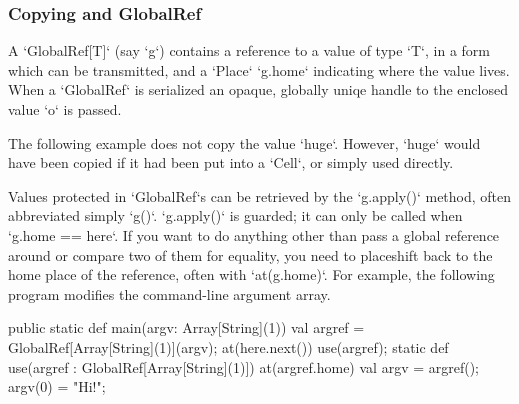 \subsubsection{Copying and GlobalRef}
\label{GlobalRef}

A \xcd`GlobalRef[T]` (say \xcd`g`) contains a reference to
a value of type \xcd`T`, in a form which can be transmitted, and a \xcd`Place`
\xcd`g.home` indicating where the value lives. When a 
\xcd`GlobalRef` is serialized an opaque, globally uniqe handle to
the enclosed value \xcd`o` is passed. 

The following example does not copy the value \xcd`huge`.  However, \xcd`huge`
would have been copied if it had been put into a \xcd`Cell`, or simply used
directly. 
\begin{xten}
val huge = "A potentially big thing";
val href = GlobalRef(huge);
at (here) {
   use(href);
  }
}
\end{xten}


Values protected in \xcd`GlobalRef`s can be retrieved by the \xcd`g.apply()`
method, often abbreviated simply \xcd`g()`.  \xcd`g.apply()` is guarded; it can
only be called when \xcd`g.home == here`.  If you  want to do anything other
than pass a global reference around or compare two of them for equality, you
need to placeshift back to the home place of the reference, often with
\xcd`at(g.home)`.   For example, the following  program modifies the
command-line argument array.

\begin{xten}
  public static def main(argv: Array[String](1)) {
    val argref = GlobalRef[Array[String](1)](argv);
    at(here.next()) use(argref);
  }
  static def use(argref : GlobalRef[Array[String](1)]) {
    at(argref.home) {
      val argv = argref();
      argv(0) = "Hi!";
    }
  }
\end{xten}





